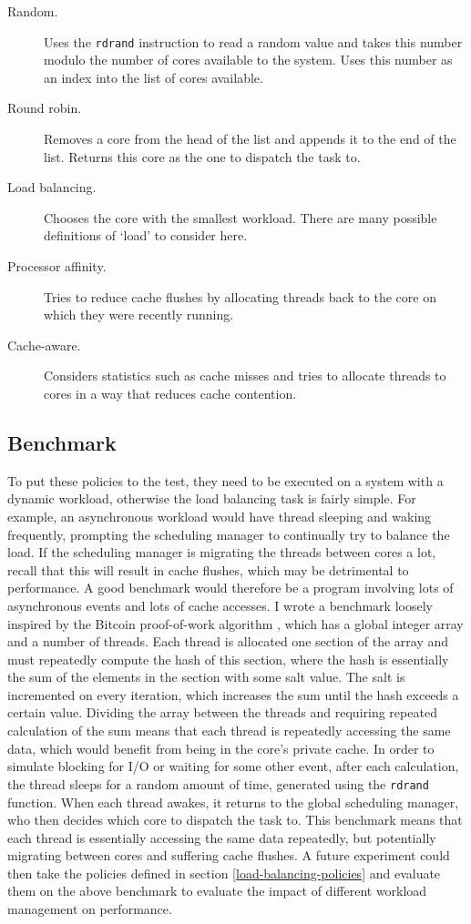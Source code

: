 \documentclass[bsc,frontabs,singlespacing,parskip,deptreport]{infthesis}
\begin{document}
\begin{description}
\item[Random.] Uses the \verb|rdrand| instruction to read a random value and takes this number modulo the number of cores available to the system. Uses this number as an index into the list of cores available.
\item[Round robin.] Removes a core from the head of the list and appends it to the end of the list. Returns this core as the one to dispatch the task to.
\item[Load balancing.] Chooses the core with the smallest workload. There are many possible definitions of `load' to consider here.
\item[Processor affinity.] Tries to reduce cache flushes by allocating threads back to the core on which they were recently running.
\item[Cache-aware.] Considers statistics such as cache misses and tries to allocate threads to cores in a way that reduces cache contention.
\end{description}

\subsection{Benchmark}
To put these policies to the test, they need to be executed on a system with a dynamic workload, otherwise the load balancing task is fairly simple. For example, an asynchronous workload would have thread sleeping and waking frequently, prompting the scheduling manager to continually try to balance the load. If the scheduling manager is migrating the threads between cores a lot, recall that this will result in cache flushes, which may be detrimental to performance. A good benchmark would therefore be a program involving lots of asynchronous events and lots of cache accesses. I wrote a benchmark loosely inspired by the Bitcoin proof-of-work algorithm \cite{proof-of-work}, which has a global integer array and a number of threads. Each thread is allocated one section of the array and must repeatedly compute the hash of this section, where the hash is essentially the sum of the elements in the section with some salt value. The salt is incremented on every iteration, which increases the sum until the hash exceeds a certain value. Dividing the array between the threads and requiring repeated calculation of the sum means that each thread is repeatedly accessing the same data, which would benefit from being in the core's private cache. In order to simulate blocking for I/O or waiting for some other event, after each calculation, the thread sleeps for a random amount of time, generated using the \verb|rdrand| function. When each thread awakes, it returns to the global scheduling manager, who then decides which core to dispatch the task to. This benchmark means that each thread is essentially accessing the same data repeatedly, but potentially migrating between cores and suffering cache flushes. A future experiment could then take the policies defined in section \ref{load-balancing-policies} and evaluate them on the above benchmark to evaluate the impact of different workload management on performance.



\end{document}
